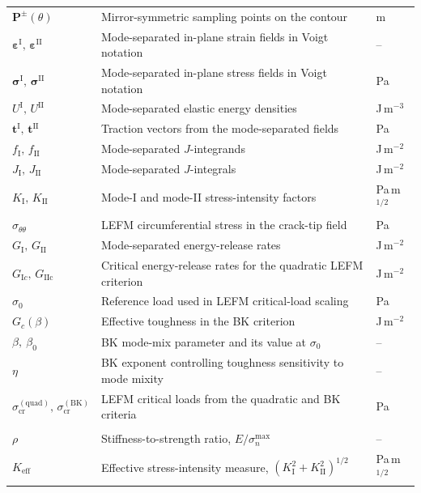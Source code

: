 \documentclass[smallextended]{svjour3}       %
\newcommand{\vb}[1]{\bm{#1}}      %
\begin{document}
{\begin{longtable}{@{}>{\raggedright\arraybackslash}p{}%
			>{\raggedright\arraybackslash}p{}%
			>{\raggedleft\arraybackslash}p{}@{}}
		\midrule
	\(\vb P^{\pm}(\theta)\) & Mirror-symmetric sampling points on the contour & m\\
	\(\vb\varepsilon^{\mathrm I},\,\vb\varepsilon^{\mathrm{II}}\) & Mode-separated in-plane strain fields in Voigt notation & --\\
	\(\vb\sigma^{\mathrm I},\,\vb\sigma^{\mathrm{II}}\) & Mode-separated in-plane stress fields in Voigt notation & Pa\\
		\(U^{\mathrm I},\,U^{\mathrm{II}}\) & Mode-separated elastic energy densities & J\,m\(^{-3}\)\\
		\(\vb t^{\mathrm I},\,\vb t^{\mathrm{II}}\) & Traction vectors from the mode-separated fields & Pa\\
		\(f_{\mathrm I},\,f_{\mathrm{II}}\) & Mode-separated \(J\)-integrands & J\,m\(^{-2}\)\\
		\(J_{\mathrm I},\,J_{\mathrm{II}}\) & Mode-separated \(J\)-integrals & J\,m\(^{-2}\)\\
		\(K_{\mathrm I},\,K_{\mathrm{II}}\) & Mode-I and mode-II stress-intensity factors & Pa\,m\(^{1/2}\)\\
		\(\sigma_{\theta\theta}\) & LEFM circumferential stress in the crack-tip field & Pa\\
		\(G_{\mathrm I},\,G_{\mathrm{II}}\) & Mode-separated energy-release rates & J\,m\(^{-2}\)\\
		\(G_{\mathrm Ic},\,G_{\mathrm{IIc}}\) & Critical energy-release rates for the quadratic LEFM criterion & J\,m\(^{-2}\)\\
		\(\sigma_0\) & Reference load used in LEFM critical-load scaling & Pa\\
		\(G_c(\beta)\) & Effective toughness in the BK criterion & J\,m\(^{-2}\)\\
		\(\beta,\ \beta_0\) & BK mode-mix parameter and its value at \(\sigma_0\) & --\\
		\(\eta\) & BK exponent controlling toughness sensitivity to mode mixity & --\\
		\(\sigma_{\mathrm{cr}}^{(\mathrm{quad})},\,\sigma_{\mathrm{cr}}^{(\mathrm{BK})}\) & LEFM critical loads from the quadratic and BK criteria & Pa\\
		\multicolumn{3}{@{}l@{}}{\textbf{Sensitivity study and outputs}}\\
		\midrule
		\(\rho\) & Stiffness-to-strength ratio, \(E/\sigma_n^{\max}\) & --\\
		\(K_{\mathrm{eff}}\) & Effective stress-intensity measure, \((K_{\mathrm I}^2+K_{\mathrm{II}}^2)^{1/2}\) & Pa\,m\(^{1/2}\)\\

\end{longtable}}
\end{document}

